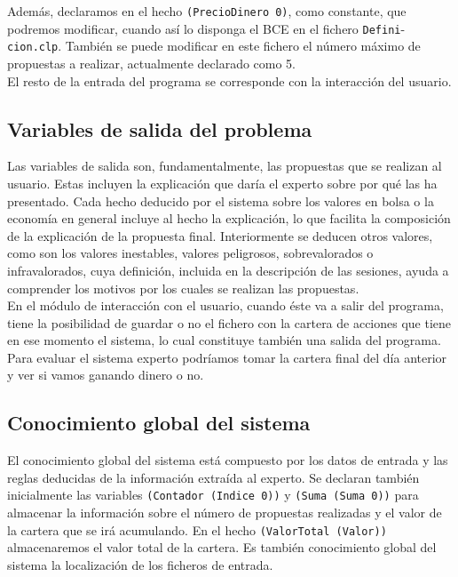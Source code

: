 \documentclass[11pt,leqno]{article}
\theoremstyle{definition_wo_parentheses}
\theoremstyle{plain}
\theoremstyle{remark}
\begin{document}
	Además, declaramos en el hecho \texttt{(PrecioDinero 0)}, como constante, que podremos modificar, cuando así lo disponga el BCE en el fichero \texttt{Defini}-\texttt{cion.clp}. También se puede modificar en este fichero el número máximo de propuestas a realizar, actualmente declarado como 5.\\
	El resto de la entrada del programa se corresponde con la interacción del usuario.
	
\subsection{Variables de salida del problema}
	
	Las variables de salida son, fundamentalmente, las propuestas que se realizan al usuario. Estas incluyen la explicación que daría el experto sobre por qué las ha presentado. Cada hecho deducido por el sistema sobre los valores en bolsa o la economía en general incluye al hecho la explicación, lo que facilita la composición de la explicación de la propuesta final. Interiormente se deducen otros valores, como son los valores inestables, valores peligrosos, sobrevalorados o infravalorados, cuya definición,  incluida en la descripción de las sesiones, ayuda a comprender los motivos por los cuales se realizan las propuestas.\\
	En el módulo de interacción con el usuario, cuando éste va a salir del programa, tiene la posibilidad de guardar o no el fichero con la cartera de acciones que tiene en ese momento el sistema, lo cual constituye también una salida del programa. Para evaluar el sistema experto podríamos tomar la cartera final del día anterior y ver si vamos ganando dinero o no.
	
\subsection{Conocimiento global del sistema}

	El conocimiento global del sistema está compuesto por los datos de entrada y las reglas deducidas de la información extraída al experto. Se declaran también inicialmente las variables \texttt{(Contador (Indice 0))} y \texttt{(Suma (Suma 0))} para almacenar la información sobre el número de propuestas realizadas y el valor de la cartera que se irá acumulando. En el hecho \texttt{(ValorTotal (Valor))} almacenaremos el valor total de la cartera. Es también conocimiento global del sistema la localización de los ficheros de entrada.
	
\end{document}

